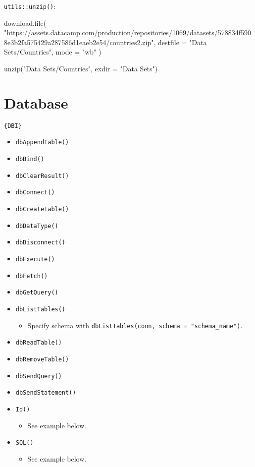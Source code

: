 \documentclass[
]{book}
\newenvironment{Shaded}{\begin{snugshade}}{\end{snugshade}}
\newcommand{\AttributeTok}[1]{\textcolor[rgb]{0.77,0.63,0.00}{#1}}
\newcommand{\FunctionTok}[1]{\textcolor[rgb]{0.00,0.00,0.00}{#1}}
\newcommand{\NormalTok}[1]{#1}
\newcommand{\StringTok}[1]{\textcolor[rgb]{0.31,0.60,0.02}{#1}}
\providecommand{\tightlist}{%
  \setlength{\itemsep}{0pt}\setlength{\parskip}{0pt}}
\begin{document}
\texttt{utils::unzip()}:

\begin{Shaded}
\begin{Highlighting}[]
\FunctionTok{download.file}\NormalTok{(}
  \StringTok{"https://assets.datacamp.com/production/repositories/1069/datasets/578834f5908e3b2fa575429a287586d1eaeb2e54/countries2.zip"}\NormalTok{,}
  \AttributeTok{destfile =} \StringTok{"Data Sets/Countries"}\NormalTok{,}
  \AttributeTok{mode =} \StringTok{"wb"}
\NormalTok{)}

\FunctionTok{unzip}\NormalTok{(}\StringTok{"Data Sets/Countries"}\NormalTok{, }\AttributeTok{exdir =} \StringTok{"Data Sets"}\NormalTok{)}
\end{Highlighting}
\end{Shaded}

\hypertarget{database}{%
\section{Database}\label{database}}

\texttt{\{DBI\}}

\begin{itemize}
\tightlist
\item
  \texttt{dbAppendTable()}
\item
  \texttt{dbBind()}
\item
  \texttt{dbClearResult()}
\item
  \texttt{dbConnect()}
\item
  \texttt{dbCreateTable()}
\item
  \texttt{dbDataType()}
\item
  \texttt{dbDisconnect()}
\item
  \texttt{dbExecute()}
\item
  \texttt{dbFetch()}
\item
  \texttt{dbGetQuery()}
\item
  \texttt{dbListTables()}

  \begin{itemize}
  \tightlist
  \item
    Specify schema with \texttt{dbListTables(conn,\ schema\ =\ "schema\_name")}.
  \end{itemize}
\item
  \texttt{dbReadTable()}
\item
  \texttt{dbRemoveTable()}
\item
  \texttt{dbSendQuery()}
\item
  \texttt{dbSendStatement()}
\item
  \texttt{Id()}

  \begin{itemize}
  \tightlist
  \item
    See example below.
  \end{itemize}
\item
  \texttt{SQL()}

  \begin{itemize}
  \tightlist
  \item
    See example below.
  \end{itemize}
\end{itemize}
\end{document}
